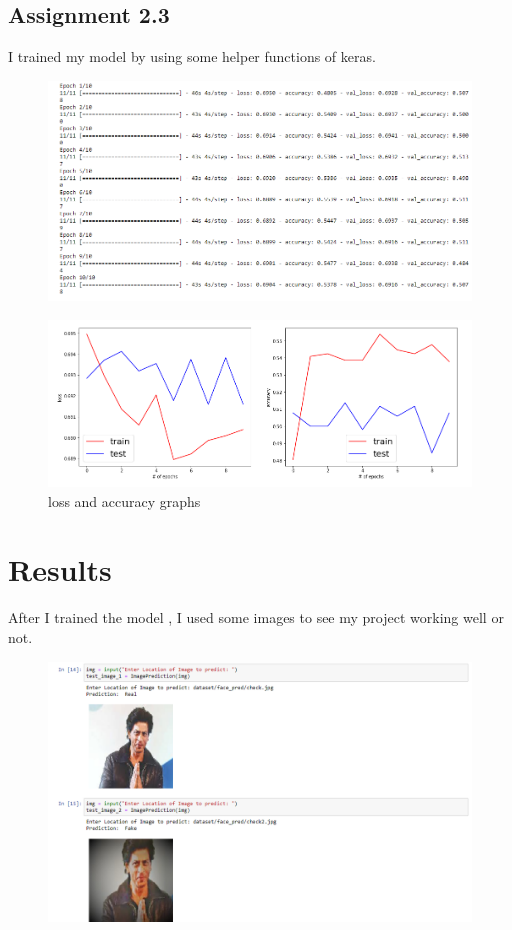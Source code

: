 \documentclass[onecolumn]{article}
\begin{document}
\subsection{Assignment 2.3}
I trained my model by using some helper functions of keras.

\begin{figure}[H]
\centering
    \includegraphics[width=1\linewidth]{assg3.png}
\caption{}
\end{figure}


\begin{figure}[H]
\centering
    \includegraphics[width=1\linewidth]{assg33.png}
\caption{loss and accuracy graphs}
\end{figure}


\section{Results}

After I trained the model , I used some images to see my project working well or not.

\begin{figure}[H]
\centering
    \includegraphics[width=1\linewidth]{result1.png}
\caption{}
\end{figure}
\end{document}
